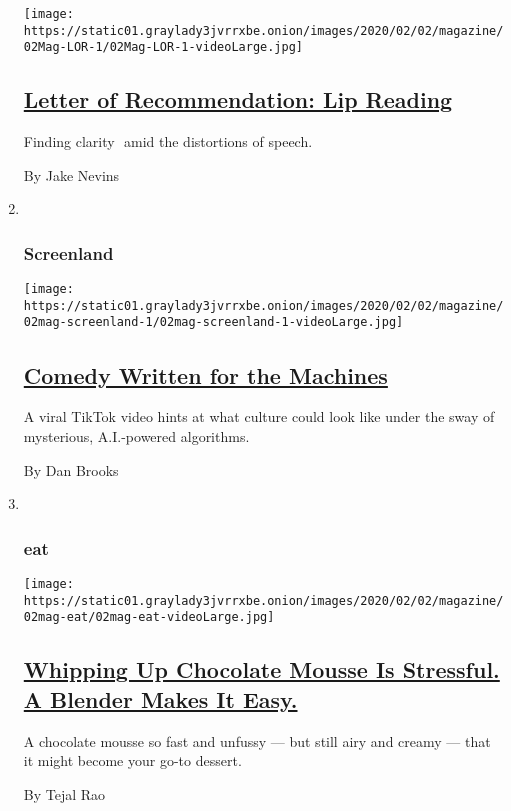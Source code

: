 \begin{enumerate}
  \texttt{[image: https://static01.graylady3jvrrxbe.onion/images/2020/02/02/magazine/02Mag-LOR-1/02Mag-LOR-1-videoLarge.jpg]}

  \hypertarget{letter-of-recommendation-lip-reading}{%
  \subsection{\texorpdfstring{\href{/2020/01/28/magazine/letter-of-recommendation-lip-reading.html}{Letter
  of Recommendation: Lip
  Reading}}{Letter of Recommendation: Lip Reading}}\label{letter-of-recommendation-lip-reading}}

  Finding clarity  amid the distortions of speech.

  By Jake Nevins
\item ~
  \hypertarget{screenland}{%
  \subsubsection{Screenland}\label{screenland}}

  \texttt{[image: https://static01.graylady3jvrrxbe.onion/images/2020/02/02/magazine/02mag-screenland-1/02mag-screenland-1-videoLarge.jpg]}

  \hypertarget{comedy-written-for-the-machines}{%
  \subsection{\texorpdfstring{\href{/2020/01/29/magazine/tiktok-viral-angelmamii7.html}{Comedy
  Written for the
  Machines}}{Comedy Written for the Machines}}\label{comedy-written-for-the-machines}}

  A viral TikTok video hints at what culture could look like under the
  sway of mysterious, A.I.-powered algorithms.

  By Dan Brooks
\item ~
  \hypertarget{eat}{%
  \subsubsection{eat}\label{eat}}

  \texttt{[image: https://static01.graylady3jvrrxbe.onion/images/2020/02/02/magazine/02mag-eat/02mag-eat-videoLarge.jpg]}

  \hypertarget{whipping-up-chocolate-mousse-is-stressful-a-blender-makes-it-easy}{%
  \subsection{\texorpdfstring{\href{/2020/01/29/magazine/blender-chocolate-recipe.html}{Whipping
  Up Chocolate Mousse Is Stressful. A Blender Makes It
  Easy.}}{Whipping Up Chocolate Mousse Is Stressful. A Blender Makes It Easy.}}\label{whipping-up-chocolate-mousse-is-stressful-a-blender-makes-it-easy}}

  A chocolate mousse so fast and unfussy --- but still airy and creamy
  --- that it might become your go-to dessert.

  By Tejal Rao
\end{enumerate}

